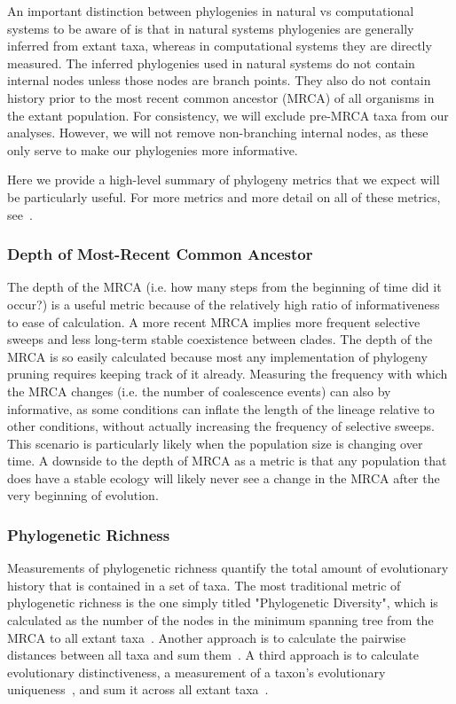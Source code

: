 \documentclass[letterpaper]{article}
\begin{document}
An important distinction between phylogenies in natural vs computational systems to be aware of is that in natural systems phylogenies are generally inferred from extant taxa, whereas in computational systems they are directly measured. The inferred phylogenies used in natural systems do not contain internal nodes unless those nodes are branch points. They also do not contain history prior to the most recent common ancestor (MRCA) of all organisms in the extant population. For consistency, we will exclude pre-MRCA taxa from our analyses. However, we will not remove non-branching internal nodes, as these only serve to make our phylogenies more informative.

Here we provide a high-level summary of phylogeny metrics that we expect will be particularly useful. For more metrics and more detail on all of these metrics, see~\citep{winter_phylogenetic_2013, tucker_guide_2017}. 

\subsubsection{Depth of Most-Recent Common Ancestor}

The depth of the MRCA (i.e. how many steps from the beginning of time did it occur?) is a useful metric because of the relatively high ratio of informativeness to ease of calculation. A more recent MRCA implies more frequent selective sweeps and less long-term stable coexistence between clades. The depth of the MRCA is so easily calculated because most any implementation of phylogeny pruning requires keeping track of it already. Measuring the frequency with which the MRCA changes (i.e. the number of coalescence events) can also by informative, as some conditions can inflate the length of the lineage relative to other conditions, without actually increasing the frequency of selective sweeps. This scenario is particularly likely when the population size is changing over time. A downside to the depth of MRCA as a metric is that any population that does have a stable ecology will likely never see a change in the MRCA after the very beginning of evolution.

\subsubsection{Phylogenetic Richness}

Measurements of phylogenetic richness quantify the total amount of evolutionary history that is contained in a set of taxa. The most traditional metric of phylogenetic richness is the one simply titled "Phylogenetic Diversity", which is calculated as the number of the nodes in the minimum spanning tree from the MRCA to all extant taxa~\citep{faith_conservation_1992}. Another approach is to calculate the pairwise distances between all taxa and sum them~\citep{tucker_guide_2017}. A third approach is to calculate evolutionary distinctiveness, a measurement of a taxon's evolutionary uniqueness~\citep{isaac_mammals_2007}, and sum it across all extant taxa~\citep{tucker_guide_2017}.
\end{document}
